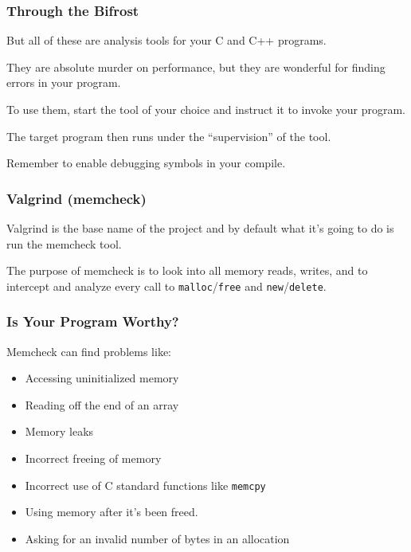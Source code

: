 \begin{frame}
\frametitle{Through the Bifrost}

But all of these are analysis tools for your C and C++ programs. 

They are absolute murder on performance, but they are wonderful for finding errors in your program. 

To use them, start the tool of your choice and instruct it to invoke your program. 

The target program then runs under the ``supervision'' of the tool.

Remember to enable debugging symbols in your compile.

\end{frame}

\begin{frame}
\frametitle{Valgrind (memcheck)}

Valgrind is the base name of the project and by default what it's going to do is run the memcheck tool. 

The purpose of memcheck is to look into all memory reads, writes, and to intercept and analyze every call to \texttt{malloc}/\texttt{free} and \texttt{new}/\texttt{delete}.

\end{frame}

\begin{frame}
\frametitle{Is Your Program Worthy?}

Memcheck can find problems like:
\begin{itemize}
	\item Accessing uninitialized memory
	\item Reading off the end of an array
	\item Memory leaks
	\item Incorrect freeing of memory
	\item Incorrect use of C standard functions like \texttt{memcpy}
	\item Using memory after it's been freed.
	\item Asking for an invalid number of bytes in an allocation
\end{itemize}

\end{frame}

